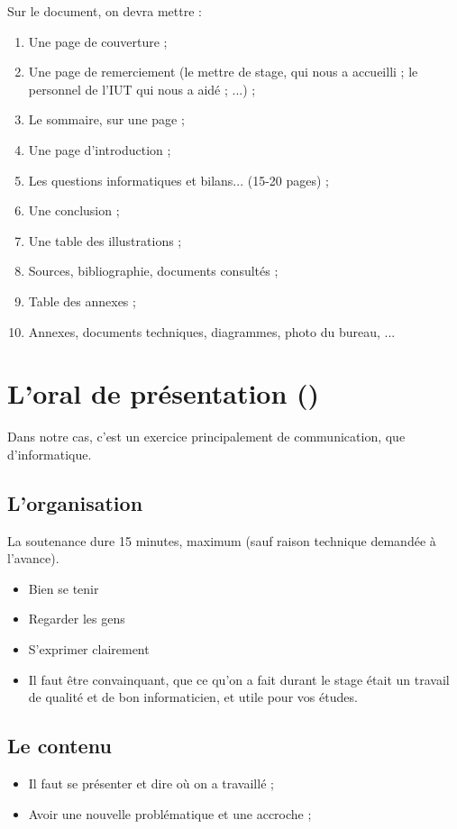 \documentclass[final, a4paper, 11pt]{article}
\begin{document}
Sur le document, on devra mettre :
\begin{enumerate}
	\item Une page de couverture ;
	\item Une page de remerciement (le mettre de stage, qui nous a accueilli ; le personnel de l'IUT qui nous a aidé ; ...) ;
	\item Le sommaire, sur une page ;
	\item Une page d'introduction ;
	\item Les questions informatiques et bilans... (15-20 pages) ;
	\item Une conclusion ;
	\item Une table des illustrations ;
	\item Sources, bibliographie, documents consultés ;
	\item Table des annexes ;
	\item Annexes, documents techniques, diagrammes, photo du bureau, ...
\end{enumerate}

\section{L'oral de présentation ()}
Dans notre cas, c'est un exercice principalement de communication, que d'informatique.

\subsection{L'organisation}
La soutenance dure 15 minutes, maximum (sauf raison technique demandée à l'avance).

\begin{itemize}
	\item Bien se tenir
	\item Regarder les gens
	\item S'exprimer clairement
	\item Il faut être convainquant, que ce qu'on a fait durant le stage était un travail de qualité et de bon informaticien, et utile pour vos études.
\end{itemize}

\subsection{Le contenu}
\begin{itemize}
	\item Il faut se présenter et dire où on a travaillé ;
	\item Avoir une nouvelle problématique et une accroche ;
\end{itemize}
\end{document}
